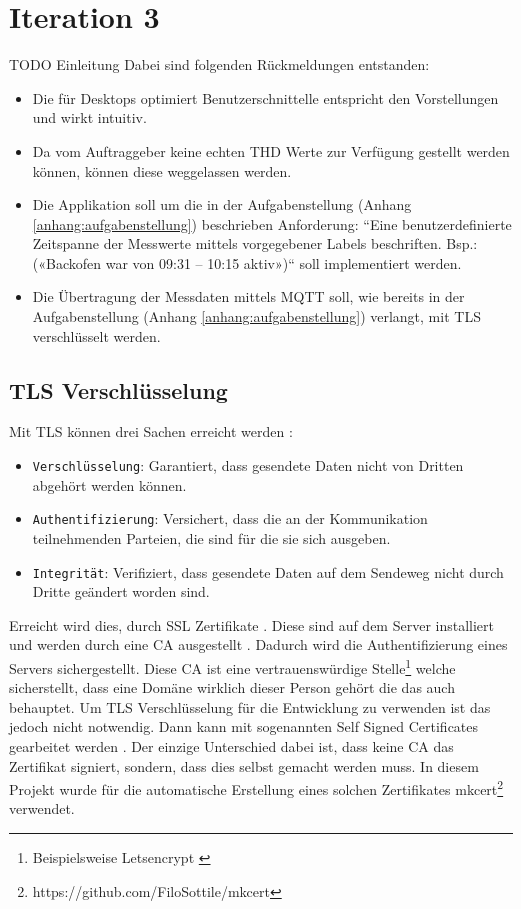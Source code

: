 \section{Iteration 3}
TODO Einleitung
Dabei sind folgenden Rückmeldungen entstanden:
\begin{itemize}
    \item Die für Desktops optimiert Benutzerschnittelle entspricht den Vorstellungen und wirkt intuitiv.
    \item Da vom Auftraggeber keine echten \ac{THD} Werte zur Verfügung gestellt werden können,
    können diese weggelassen werden.
    \item Die Applikation soll um die in der Aufgabenstellung (Anhang \ref{anhang:aufgabenstellung}) beschrieben Anforderung:
    ``Eine benutzerdefinierte Zeitspanne der Messwerte mittels vorgegebener
    Labels beschriften. Bsp.: («Backofen war von 09:31 – 10:15 aktiv»)`` soll implementiert werden.
    \item Die Übertragung der Messdaten mittels \ac{MQTT} soll,
     wie bereits in der Aufgabenstellung (Anhang \ref{anhang:aufgabenstellung}) verlangt, mit \ac{TLS} verschlüsselt werden.
\end{itemize}

\subsection{\ac{TLS} Verschlüsselung}

Mit \ac{TLS} können drei Sachen erreicht werden \parencite{what_is_tls}:

\begin{itemize}
    \item \texttt{Verschlüsselung}: Garantiert, dass gesendete Daten nicht von Dritten abgehört werden können.
    \item \texttt{Authentifizierung}: Versichert, dass die an der Kommunikation teilnehmenden Parteien, die sind für die sie sich ausgeben.
    \item \texttt{Integrität}: Verifiziert, dass gesendete Daten auf dem Sendeweg nicht durch Dritte geändert worden sind.
\end{itemize}

Erreicht wird dies, durch SSL Zertifikate \parencite{what_is_ssl_certificate}. Diese sind auf dem Server
installiert und werden durch eine \ac{CA} ausgestellt \parencite{what_is_ca}.
Dadurch wird die Authentifizierung eines Servers sichergestellt.
Diese \ac{CA} ist eine vertrauenswürdige Stelle\footnote{
    Beispielsweise Letsencrypt \parencite{letsencrypt_2021}
} welche sicherstellt, dass eine Domäne wirklich dieser Person gehört die das auch behauptet.
Um \ac{TLS} Verschlüsselung für die Entwicklung zu verwenden ist das jedoch nicht notwendig.
Dann kann mit sogenannten Self Signed Certificates gearbeitet werden \parencite{self_signed_cert}.
Der einzige Unterschied dabei ist, dass keine \ac{CA} das Zertifikat signiert, sondern, dass
dies selbst gemacht werden muss. In diesem Projekt wurde für die automatische Erstellung eines solchen
Zertifikates mkcert\footnote{https://github.com/FiloSottile/mkcert} verwendet.


